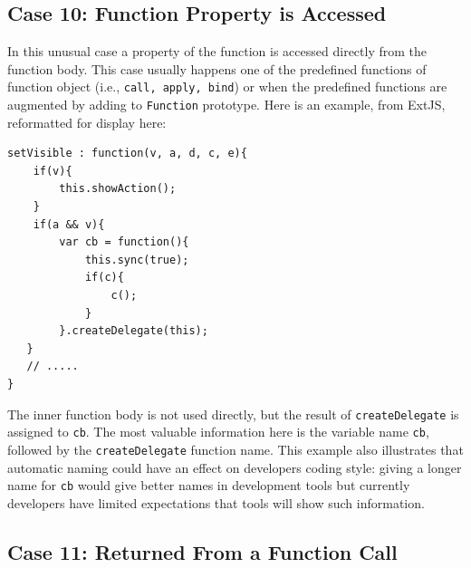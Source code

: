 \documentclass[10pt, preprint]{sigplanconf}
\begin{document}
\subsection{Case 10: Function Property is Accessed}
\label{sec:funcprop}
In this unusual case a property of the function is accessed directly from the function body. This case usually happens one of the predefined functions of function object (i.e., {\small\texttt{call, apply, bind}}) or when the predefined functions are augmented by adding to {\small\texttt{Function}} prototype.  Here is an example, from ExtJS, reformatted for display here:
\begin{verbatim}
setVisible : function(v, a, d, c, e){
    if(v){
        this.showAction();
    }
    if(a && v){
        var cb = function(){
            this.sync(true);
            if(c){
                c();
            }
        }.createDelegate(this);
   }
   // .....
}
\end{verbatim}
The inner function body is not used directly, but the result of \verb|createDelegate| is assigned to \verb|cb|. The most valuable information here is the variable name \verb|cb|, followed by the \verb|createDelegate| function name.  This example also illustrates that automatic naming could have an effect on developers coding style:  giving a longer name for \verb|cb| would give better names in development tools but currently developers have limited expectations that tools will show such information.

\subsection{Case 11:  Returned From a Function Call}
\end{document}
